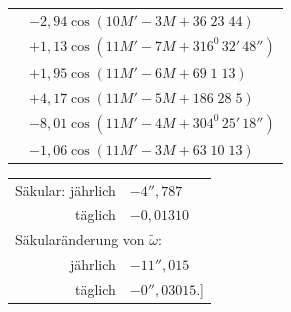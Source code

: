 \begin{landscape}
\begin{longtable}{@{}r@{}l@{}}
&\(-2{,}94\cos(10M'-3M+36\;23\;44)\)\\[3pt]
&\(+1{,}13\cos(11M'-7M+316^0\,32'\,48'')\)\\
&\(+1{,}95\cos(11M'-6M+69\;1\;13)\)\\
&\(+4{,}17\cos(11M'-5M+186\;28\;5)\)\\
&\(-8{,}01\cos(11M'-4M+304^0\,25'\,18'')\)\\
&\(-1{,}06\cos(11M'-3M+63\;10\;13)\)
\end{longtable}
\begin{center}
\begin{tabular}{rl}
Säkular: jährlich&\(-4''{,}787\)\\
täglich&\(-0{,}01310\)\\[4pt]
\multicolumn{2}{l}{Säkularänderung von \(\tilde\omega\):}\\[4pt]
jährlich&\(-11''{,}015\)\\
täglich&\(-0''{,}03015\).]
\end{tabular}
\end{center}
\endgroup
\clearpage
\endgroup
\end{landscape}
